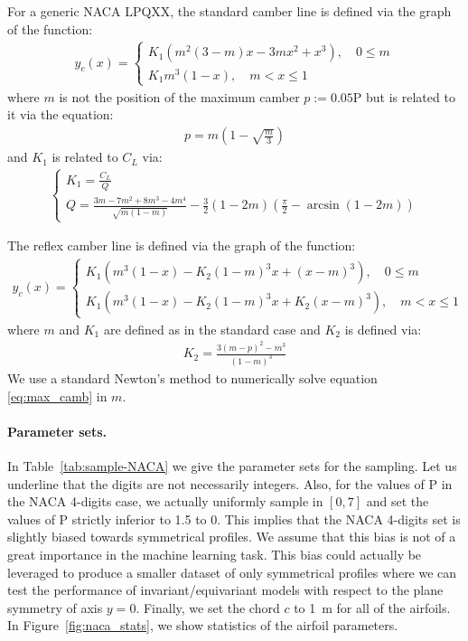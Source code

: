 \begin{subappendices}
	For a generic NACA LPQXX, the standard camber line is defined via the graph of the function:
	\begin{align}
		y_c(x) = 
		\begin{cases}
			K_1\left(m^2(3-m)x - 3mx^2 + x^3\right), \quad 0\leqslant m \\
			K_1m^3(1-x), \quad m< x \leqslant 1
		\end{cases}
	\end{align}
	where $m$ is not the position of the maximum camber $p := 0.05$P but is related to it via the equation:
	\begin{align}\label{eq:max_camb}
		p = m\left(1-\sqrt{\frac{m}{3}}\right)
	\end{align}
	and $K_1$ is related to $C_L$ via:
	\begin{align}
		\begin{cases}
			K_1 = \frac{C_L}{Q} \\
			Q = \frac{3m - 7m^2 + 8m^3 - 4m^4}{\sqrt{m(1-m)}} - \frac{3}{2}(1-2m)\left(\frac{\pi}{2} - \arcsin(1-2m)\right)
		\end{cases}
	\end{align}
	
	The reflex camber line is defined via the graph of the function:
	\begin{align}
		y_c(x) = 
		\begin{cases}
			K_1\left(m^3(1-x) - K_2(1-m)^3x + (x-m)^3\right), \quad 0\leqslant m \\
			K_1\left(m^3(1-x) - K_2(1-m)^3x + K_2(x-m)^3\right), \quad m< x \leqslant 1
		\end{cases}
	\end{align}
	where $m$ and $K_1$ are defined as in the standard case and $K_2$ is defined via:
	\begin{align}
		K_2 = \frac{3(m - p)^2 - m^3}{(1-m)^3}
	\end{align}
	We use a standard Newton's method to numerically solve equation \ref{eq:max_camb} in $m$.
	
	\paragraph{Parameter sets.}\label{sec:naca_sample} In Table~\ref{tab:sample-NACA} we give the parameter sets for the sampling. Let us underline that the digits are not necessarily integers. Also, for the values of P in the NACA 4-digits case, we actually uniformly sample in $[0, 7]$ and set the values of P strictly inferior to 1.5 to 0. This implies that the NACA 4-digits set is slightly biased towards symmetrical profiles. We assume that this bias is not of a great importance in the machine learning task. This bias could actually be leveraged to produce a smaller dataset of only symmetrical profiles where we can test the performance of invariant/equivariant models with respect to the plane symmetry of axis $y = 0$. Finally, we set the chord $c$ to \SI{1}{\meter} for all of the airfoils. In Figure~\ref{fig:naca_stats}, we show statistics of the airfoil parameters. 
	

\end{subappendices}
